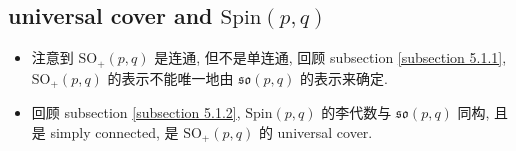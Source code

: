 \subsection{universal cover and \texorpdfstring{$\mathrm{Spin}(p, q)$}{Spin(p, q)}}
\begin{itemize}
	\item 注意到 $\mathrm{SO}_+(p, q)$ 是连通, 但不是单连通, 回顾 subsection \ref{subsection 5.1.1}, $\mathrm{SO}_+(p, q)$ 的表示不能唯一地由 $\mathfrak{so}(p, q)$ 的表示来确定.
	
	\item 回顾 subsection \ref{subsection 5.1.2}, $\mathrm{Spin}(p, q)$ 的李代数与 $\mathfrak{so}(p, q)$ 同构, 且是 simply connected, 是 $\mathrm{SO}_+(p, q)$ 的 universal cover.
\end{itemize}

